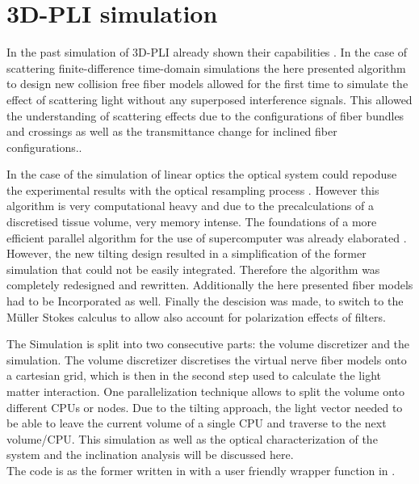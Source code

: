 \setcounter{chapter}{4}
\chapter{\acs{3D-PLI} simulation}
\label{cha:sof:simulation}
%
In the past simulation of \ac{3D-PLI} already shown their capabilities \cite{Dohmen2015,Menzel2015,Menzel2016,Menzel2020,Menzel2021,MenzelMaster,MenzelDissertation}.
In the case of scattering finite-difference time-domain simulations the here presented algorithm to design new collision free fiber models allowed for the first time to simulate the effect of scattering light without any superposed interference signals.
This allowed the understanding of scattering effects due to the configurations of fiber bundles and crossings as well as the transmittance change for inclined fiber configurations.\cite{MenzelDissertation,Menzel2020,Menzel2021}.
\par
% 
In the case of the simulation of linear optics the optical system could repoduse the experimental results with \eg{} the optical resampling process \cite{Dohmen2015,Menzel2016}.
However this algorithm is very computational heavy and due to the precalculations of a discretised tissue volume, very memory intense.
The foundations of a more efficient parallel algorithm for the use of supercomputer was already elaborated \cite{Lucksch2016}.
However, the new tilting design resulted in a simplification of the former simulation that could not be easily integrated.
Therefore the algorithm was completely redesigned and rewritten.
Additionally the here presented fiber models had to be Incorporated as well.
Finally the descision was made, to switch to the M\"{u}ller Stokes calculus to allow also account for polarization effects of filters.
\par
%
The Simulation is split into two consecutive parts: the volume discretizer and the simulation.
The volume discretizer discretises the virtual nerve fiber models onto a cartesian grid, which is then in the second step used to calculate the light matter interaction.
One parallelization technique allows to split the volume onto different \acp{CPU} or nodes.
Due to the tilting approach, the light vector needed to be able to leave the current volume of a single \ac{CPU} and traverse to the next volume/\ac{CPU}.
This simulation as well as the optical characterization of the system and the inclination analysis will be discussed here.
\\
%
The code is as the former written in \cpp{} with a user friendly wrapper function in \python{}.
%
% 
% 
